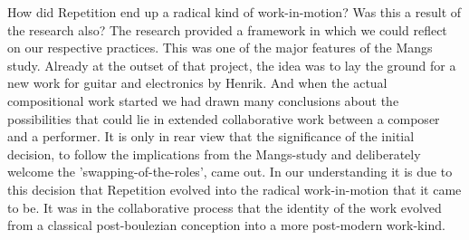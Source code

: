 How did Repetition end up a radical kind of work-in-motion? Was this a
result of the research also? The research provided a framework in
which we could reflect on our respective practices. This was one of
the major features of the Mangs study. Already at the outset of that
project, the idea was to lay the ground for a new work for guitar and
electronics by Henrik. And when the actual compositional work started
we had drawn many conclusions about the possibilities that could lie
in extended collaborative work between a composer and a performer. It
is only in rear view that the significance of the initial decision, to
follow the implications from the Mangs-study and deliberately welcome
the 'swapping-of-the-roles', came out. In our understanding it is due
to this decision that Repetition evolved into the radical
work-in-motion that it came to be. It was in the collaborative process
that the identity of the work evolved from a classical post-boulezian
conception into a more post-modern work-kind.

